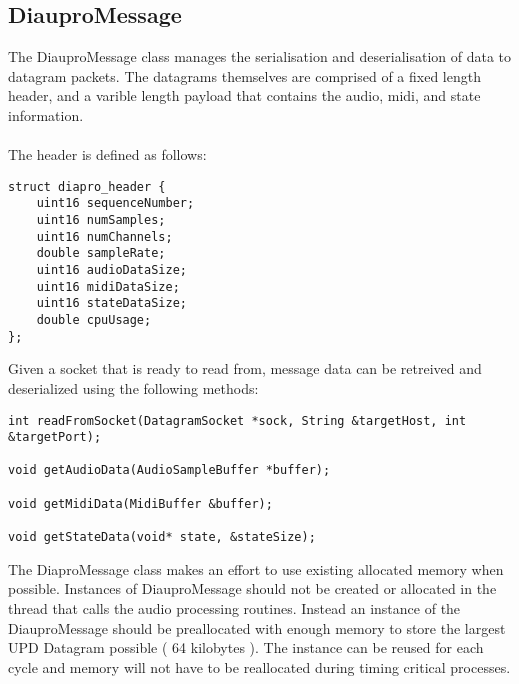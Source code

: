 \subsection{DiauproMessage}

The DiauproMessage class manages the serialisation and deserialisation of data to datagram packets. The datagrams themselves are comprised of a fixed length header, and a varible length payload that contains the audio, midi, and state information.\\
\\
The header is defined as follows:

\begin{lstlisting}
struct diapro_header {
    uint16 sequenceNumber;
    uint16 numSamples;
    uint16 numChannels;
    double sampleRate;
    uint16 audioDataSize;
    uint16 midiDataSize;
    uint16 stateDataSize;
    double cpuUsage;
};
\end{lstlisting}

\noindent
Given a socket that is ready to read from, message data can be retreived and deserialized using the following methods:

\begin{lstlisting}
int readFromSocket(DatagramSocket *sock, String &targetHost, int &targetPort);

void getAudioData(AudioSampleBuffer *buffer);

void getMidiData(MidiBuffer &buffer);

void getStateData(void* state, &stateSize);
\end{lstlisting}

The DiaproMessage class makes an effort to use existing allocated memory when possible. Instances of DiauproMessage should not be created or allocated in the thread that calls the audio processing routines. Instead an instance of the DiauproMessage should be preallocated with enough memory to store the largest UPD Datagram possible ( 64 kilobytes ). The instance can be reused for each cycle and memory will not have to be reallocated during timing critical processes.

